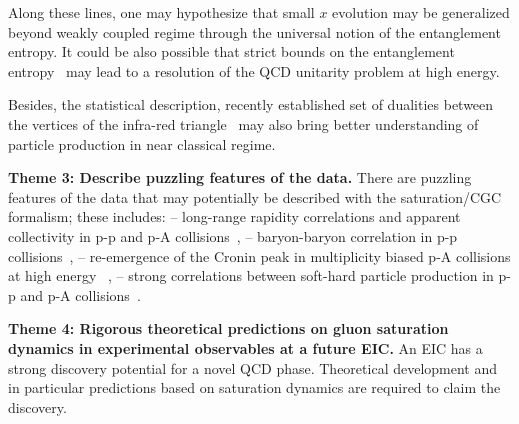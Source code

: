 Along these lines, one may hypothesize that small $x$ evolution may be generalized beyond 
weakly coupled regime through the universal notion of the entanglement entropy. 
It could be also possible  that strict bounds on the entanglement entropy~\cite{Holzhey:1994we,Calabrese:2005zw}
may lead 
to a resolution of the QCD unitarity problem at high energy. 

Besides, the statistical description, recently established set of dualities between the vertices 
of the infra-red triangle~\cite{Strominger:2017zoo,Pate:2017vwa,Ball:2018prg} may also bring better understanding of particle production in near classical regime. 

\vspace{0.5em}



\noindent

{\bf Theme 3:  Describe puzzling features of the data. }
There are puzzling features of the data that may potentially be described 
with the saturation/CGC formalism; these includes: 
-- long-range rapidity correlations and apparent collectivity in p-p and p-A 
collisions~\cite{Khachatryan:2010nk,Aad:2010ac,Aaij:2014pza,ALICE:2017pcy},  
-- baryon-baryon correlation in p-p collisions~\cite{Adam:2016iwf}, 
-- re-emergence of the Cronin peak in multiplicity biased p-A collisions at high energy~\cite{ALICE:2012mj} , 
-- strong correlations between soft-hard particle production in p-p and p-A collisions~\cite{ATLAS:2014cpa,Aad:2015ziq}. 


\vspace{0.5em}

\noindent

{\bf Theme 4:  Rigorous theoretical predictions 
on gluon saturation dynamics in experimental observables at a future EIC.}
An EIC has a strong discovery potential 
for a novel QCD phase. Theoretical development and in particular 
predictions based on saturation dynamics are required to claim  the discovery. 

\vspace{2em}


